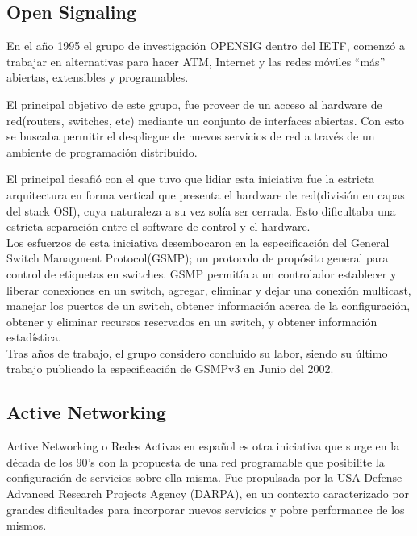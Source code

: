 \subsection{Open Signaling}
En el año 1995 el grupo de investigación OPENSIG\cite{campbell1999open} dentro del IETF, comenzó a trabajar en alternativas para hacer ATM, Internet y las redes móviles ``más'' abiertas, extensibles y programables.

El principal objetivo de este grupo, fue proveer de un acceso al hardware de red(routers, switches, etc) mediante un conjunto de interfaces abiertas. Con esto se buscaba permitir el despliegue de nuevos servicios de red a través de un ambiente de programación distribuido.

El principal desafió con el que tuvo que lidiar esta iniciativa fue la estricta arquitectura en forma vertical que presenta el hardware de red(división en capas del stack OSI), cuya naturaleza a su vez solía ser cerrada. Esto dificultaba una estricta separación entre el software de control y el hardware.\\

Los esfuerzos de esta iniciativa desembocaron en la especificación del General Switch Managment Protocol(GSMP); un protocolo de propósito general para control de etiquetas en switches.
GSMP permitía a un controlador establecer y liberar conexiones en un switch, agregar, eliminar
y dejar una conexión multicast, manejar los puertos de un switch, obtener información acerca de la configuración, obtener y eliminar recursos reservados en un switch, y obtener información estadística.\\

Tras años de trabajo, el grupo considero concluido su labor, siendo su último trabajo publicado la especificación de GSMPv3 en Junio del 2002\cite{doria2002general}.

\subsection{Active Networking}
Active Networking\citep{tennenhouse1997survey}\citep{tennenhouse2002towards}\citep{moore2001towards} o Redes Activas en español es otra iniciativa que surge en la década de los 90's con la propuesta de una red programable que posibilite la configuración de servicios sobre ella misma. Fue propulsada por la USA Defense Advanced Research Projects Agency (DARPA), en un contexto caracterizado por grandes dificultades para incorporar nuevos servicios y pobre performance de los mismos.\\

